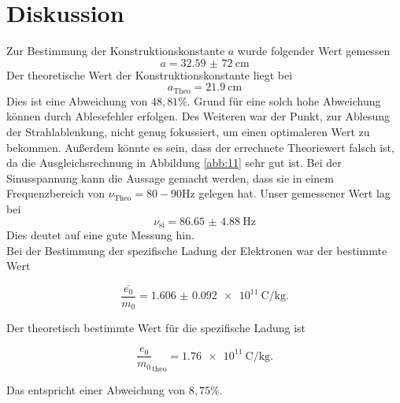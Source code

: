 \section{Diskussion}
Zur Bestimmung der Konstruktionskonstante $a$ wurde
folgender Wert gemessen
\begin{equation*}
    a = \SI{32,59(72)}{\centi\meter}
\end{equation*}
Der theoretische Wert der Konstruktionskonstante liegt bei
\begin{equation*}
   a_{\text{Theo}} = \SI{21.9}{\centi\meter}
\end{equation*}
Dies ist eine Abweichung von $48,81 \%$. Grund für eine solch hohe Abweichung
können durch Ablesefehler erfolgen. Des Weiteren war der Punkt, zur Ablesung der
Strahlablenkung, nicht genug fokussiert, um einen optimaleren Wert zu bekommen.
Außerdem könnte es sein, dass der errechnete Theoriewert falsch ist, da die Ausgleichsrechnung
in Abbildung \ref{abb:11} sehr gut ist.
Bei der Sinusspannung kann die Aussage gemacht werden, dass sie in einem Frequenzbereich
von $\nu_{\text{Theo}}=80 - 90 \si{\hertz}$ gelegen hat.
Unser gemessener Wert lag bei
\begin{equation*}
  \nu_{\text{si}}= \SI{86.65(488)}{\hertz}
\end{equation*}
Dies deutet auf eine gute Messung hin.\\
Bei der Bestimmung der spezifische Ladung der Elektronen war der bestimmte Wert

\begin{equation*}
  \overline{\frac{e_0}{m_0}} = \SI{1.606(92)e11}{\coulomb\per\kilo\gram}.
\end{equation*}

Der theoretisch bestimmte Wert für die spezifische Ladung ist

\begin{equation*}
  \frac{e_0}{m_0}_\text{theo} = \SI{1.76e11}{\coulomb\per\kilo\gram}.
\end{equation*}

Das entspricht einer Abweichung von $8,75 \%$.

